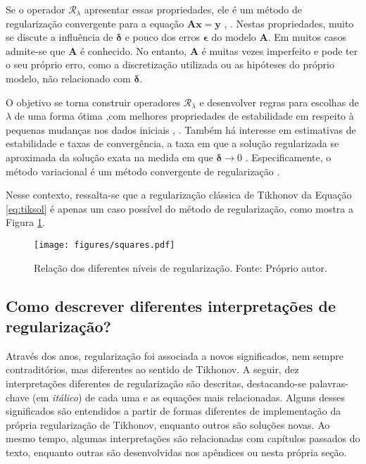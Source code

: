 Se o operador $\mathcal{R}_\lambda$ apresentar essas propriedades, ele é um método de regularização convergente para a equação $\mathbf{A} \mathbf{x} = \mathbf{y}$ \cite[pág. 50]{engl1996regularization}, \cite[pág. 48]{Mueller2012}. Nestas propriedades, muito se discute a influência de $\bm{\delta}$ e pouco dos erros $\bm{\epsilon}$ do modelo $\mathbf{A}$. Em muitos casos admite-se que $\mathbf{A}$ é conhecido. No entanto, $\mathbf{A}$ é muitas vezes imperfeito e pode ter o seu próprio erro, como a discretização utilizada ou as hipóteses do próprio modelo, não relacionado com $\bm{\delta}$. 

O objetivo se torna construir operadores $\mathcal{R}_\lambda$ \cite[págs. 50-62]{tikhonov1977solutions} e desenvolver regras para escolhas de $\lambda$ de uma forma ótima \cite{engl1996regularization},com melhores propriedades de estabilidade em respeito à pequenas mudanças nos dados iniciais \cite[pág. 1]{Benning2018}, \cite[pág. 22]{tikhonov1977solutions}. Também há interesse em estimativas de estabilidade e taxas de convergência, a taxa em que a solução regularizada se aproximada da solução exata na medida em que $\bm{\delta} \rightarrow 0$ \cite{Bertero2021, Daubechies2016}. Especificamente, o método variacional é um método convergente de regularização \cite{Benning2018}.


Nesse contexto, ressalta-se que a regularização clássica de Tikhonov da Equação \eqref{eq:tiksol} é apenas um caso possível do método de regularização, como mostra a Figura \ref{fig:01_venn}.

\begin{figure}[htpb]
\centering
\texttt{[image: figures/squares.pdf]} 
\caption[Relação dos diferentes níveis de regularização.]{Relação dos diferentes níveis de regularização. Fonte: Próprio autor.}
\label{fig:01_venn}
\end{figure}



\subsection{Como descrever diferentes interpretações de regularização?} \label{sec:III}

Através dos anos, regularização foi associada a novos significados, nem sempre contraditórios, mas diferentes ao sentido de Tikhonov. A seguir, dez interpretações diferentes de regularização são descritas, destacando-se palavras-chave (em \textit{itálico}) de cada uma e as equações mais relacionadas. Alguns desses significados são entendidos a partir de formas diferentes de implementação da própria regularização de Tikhonov, enquanto outros são soluções novas. Ao mesmo tempo, algumas interpretações são relacionadas com capítulos passados do texto, enquanto outras são desenvolvidas nos apêndices ou nesta própria seção. 

